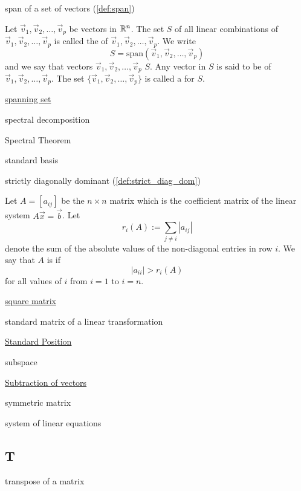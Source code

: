 \documentclass{ximera}
\begin{document}
span of a set of vectors (\ref{def:span})
\begin{expandable}
    Let $\vec{v}_1, \vec{v}_2,\ldots ,\vec{v}_p$ be vectors in $\mathbb{R}^n$.  The set $S$ of all linear combinations of $\vec{v}_1, \vec{v}_2,\ldots ,\vec{v}_p$ is called the  of $\vec{v}_1, \vec{v}_2,\ldots ,\vec{v}_p$.  We write 
$$S=\mbox{span}(\vec{v}_1, \vec{v}_2,\ldots ,\vec{v}_p)$$
and we say that vectors $\vec{v}_1, \vec{v}_2,\ldots ,\vec{v}_p$  $S$.  Any vector in $S$ is said to be  of $\vec{v}_1, \vec{v}_2,\ldots ,\vec{v}_p$.  The set $\{\vec{v}_1, \vec{v}_2,\ldots ,\vec{v}_p\}$ is called a  for $S$.
\end{expandable}

\href{https://ximera.osu.edu/oerlinalg/LinearAlgebra/VEC-0090/main}{spanning set}

spectral decomposition

Spectral Theorem

standard basis

strictly diagonally dominant (\ref{def:strict_diag_dom})
\begin{expandable}
    Let $A=[a_{ij}]$ be the $n\times n$ matrix which is the coefficient matrix of the linear system $A \vec{x}= \vec{b}$.  Let
$$
r_i(A):= \sum_{j \ne i} |a_{ij}|
$$
denote the sum of the absolute values of the non-diagonal entries in row $i$.  We say that $A$ is  if 
$$|a_{ii}|>r_i(A)$$
for all values of $i$ from $i=1$ to $i=n$.
\end{expandable}

\href{https://ximera.osu.edu/oerlinalg/LinearAlgebra/MAT-0010/main}{square matrix}

standard matrix of a linear transformation

\href{https://ximera.osu.edu/oerlinalg/LinearAlgebra/VEC-0010/main}{Standard Position}

subspace

\href{https://ximera.osu.edu/oerlinalg/LinearAlgebra/VEC-0030/main}{Subtraction of vectors}

symmetric matrix

system of linear equations



\subsection{T}

transpose of a matrix
\end{document}
